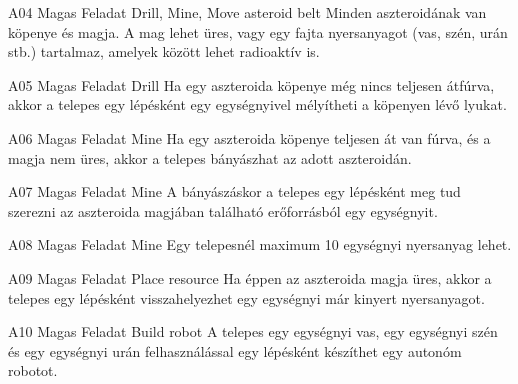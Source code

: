 \documentclass[../../projlab]{subfiles}
\begin{document}
\begin{funkovetelmeny}
	{A04}
	{Magas}
	{Feladat}
	{Drill, Mine, Move asteroid belt}
	{}
	{Minden aszteroidának van köpenye és magja. A mag lehet üres, vagy egy fajta nyersanyagot (vas, szén, urán stb.) tartalmaz, amelyek között lehet radioaktív is.}
    
\end{funkovetelmeny}

\begin{funkovetelmeny}
	{A05}
	{Magas}
	{Feladat}
	{Drill}
	{}
	{Ha egy aszteroida köpenye még nincs teljesen átfúrva, akkor a telepes egy lépésként egy egységnyivel mélyítheti a köpenyen lévő lyukat.}
    
\end{funkovetelmeny}

\begin{funkovetelmeny}
	{A06}
	{Magas}
	{Feladat}
	{Mine}
	{}
	{Ha egy aszteroida köpenye teljesen át van fúrva, és a magja nem üres, akkor a telepes bányászhat az adott aszteroidán.}
    
\end{funkovetelmeny}

\begin{funkovetelmeny}
	{A07}
	{Magas}
	{Feladat}
	{Mine}
	{}
	{A bányászáskor a telepes egy lépésként meg tud szerezni az aszteroida magjában található erőforrásból egy egységnyit. }
    
\end{funkovetelmeny}

\begin{funkovetelmeny}
	{A08}
	{Magas}
	{Feladat}
	{Mine}
	{}
	{Egy telepesnél maximum 10 egységnyi nyersanyag lehet. }
    
\end{funkovetelmeny}

\begin{funkovetelmeny}
	{A09}
	{Magas}
	{Feladat}
	{Place resource}
	{}
	{Ha éppen az aszteroida magja üres, akkor a telepes egy lépésként visszahelyezhet egy egységnyi már kinyert nyersanyagot.}
    
\end{funkovetelmeny}

\begin{funkovetelmeny}
	{A10}
	{Magas}
	{Feladat}
	{Build robot}
	{}
	{A telepes egy egységnyi vas, egy egységnyi szén és egy egységnyi urán felhasználással egy lépésként készíthet egy autonóm robotot.}
    
\end{funkovetelmeny}
\end{document}
